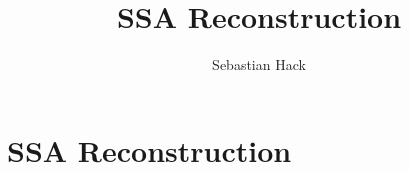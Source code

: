 
% 
% 
% 


\newcommand{\var}[1]{\mathtt{#1}}
\newcommand{\phiop}{$\phi$-function}
\newcommand{\phiops}{\phiop s}
\newcommand{\phizero}{\ensuremath{\phi_0}}


\title{SSA Reconstruction}
\author{Sebastian Hack}

\chapter{SSA Reconstruction }
\graphicspath{{repair_maintain_ssa_after_optimization/}{part1/repair_maintain_ssa_after_optimization/}}

